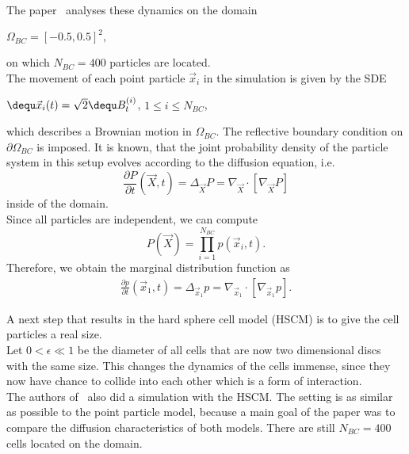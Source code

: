 The paper~\cite{Bruna2012} analyses these dynamics on the domain 
\begin{center}
    $
    \Omega_{BC} = [-0.5, 0.5]^2,
    $
\end{center}
on which $N_{BC} = 400$ particles are located. \\
The movement of each point particle $\vec{x}_i$ in the simulation is given by the SDE
\begin{center}
    $\dequ \vec{x}_i(t) = \sqrt{2} \dequ B_t^{(i)}$, \hspace{0.5em} $1 \leq i \leq N_{BC}$,
\end{center}
which describes a Brownian motion in $\Omega_{BC}$.
The reflective boundary condition on $\partial \Omega_{BC}$ is imposed.
It is known, that the joint probability density of the particle system in this setup evolves according to the diffusion equation, i.e.
\begin{equation}
    \frac{\partial P}{\partial t}(\vec{X}, t) = \Delta_{\vec{X}} P = \nabla_{\vec{X}} \cdot [ \nabla_{\vec{X}} P]
    \label{eq:heat}
\end{equation}
inside of the domain. \\
Since all particles are independent, we can compute
\begin{equation}
    P(\vec{X}) = \prod_{i=1}^{N_{BC}} p(\vec{x}_i, t).
\end{equation}
Therefore, we obtain the marginal distribution function as 
\begin{align}
    \label{equ:marginalHeat}
    \frac{\partial p}{\partial t}(\vec{x}_1, t) = \Delta_{\vec{x}_1} p = \nabla_{\vec{x}_1} \cdot [ \nabla_{\vec{x}_1} p].
\end{align}

A next step that results in the hard sphere cell model (HSCM) is to give the cell particles a real size. \\
Let $0 < \epsilon \ll 1$ be the diameter of all cells that are now two dimensional discs with the same size. 
This changes the dynamics of the cells immense, since they now have chance to collide into each other which is a form of interaction. \\
The authors of~\cite{Bruna2012} also did a simulation with the HSCM. 
The setting is as similar as possible to the point particle model, because a main goal of the paper was to compare the diffusion characteristics of both models. 
There are still $N_{BC} = 400$ cells located on the domain. \\

